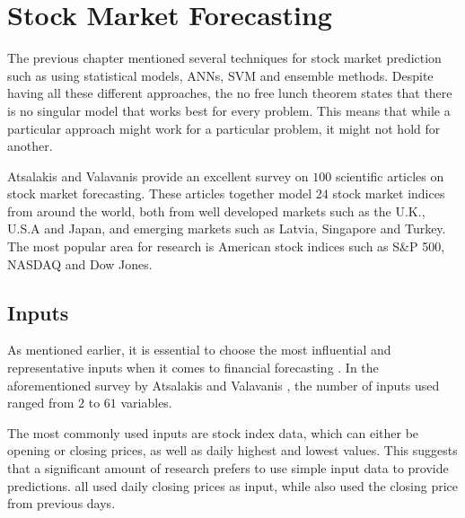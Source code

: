 \documentclass{UoYCSproject}
\begin{document}
\section{Stock Market Forecasting}
The previous chapter mentioned several techniques for stock market prediction such as using statistical models, ANNs, SVM and ensemble methods. Despite having all these different approaches, the no free lunch theorem \cite{wolpert1997no} states that there is no singular model that works best for every problem. This means that while a particular approach might work for a particular problem, it might not hold for another. 

Atsalakis and Valavanis \cite{atsalakis2009surveying} provide an excellent survey on $100$ scientific articles on stock market forecasting. These articles together model $24$ stock market indices from around the world, both from well developed markets such as the U.K., U.S.A and Japan, and emerging markets such as Latvia, Singapore and Turkey. The most popular area for research is American stock indices such as S\&P 500, NASDAQ and Dow Jones.

\subsection{Inputs}
As mentioned earlier, it is essential to choose the most influential and representative inputs when it comes to financial forecasting \cite{zhong2017forecasting}. In the aforementioned survey by Atsalakis and Valavanis \cite{atsalakis2009surveying}, the number of inputs used ranged from $2$ to $61$ variables. 

The most commonly used inputs are stock index data, which can either be opening or closing prices, as well as daily highest and lowest values. This suggests that a significant amount of research prefers to use simple input data to provide predictions. \cite{barnes2000study, donaldson1999neural, halliday2004equity, tan1995conservative, pai2005hybrid, pantazopoulos1998financial} all used daily closing prices as input, while \cite{andreou2000testing, fernandez2000profitability, pan2005predicting,tang2002web} also used the closing price from previous days. 
\end{document}
